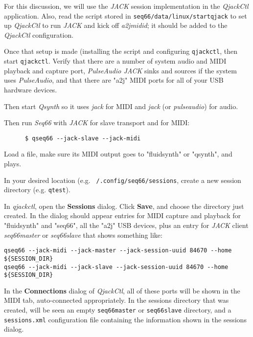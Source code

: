 
   For this discussion, we will use the \textsl{JACK} session implementation in
   the \textsl{QjackCtl} application.
   Also, read the script stored in
   \texttt{seq66/data/linux/startqjack} to set up
   \textsl{QjackCtl} to run \textsl{JACK} and kick off
   \textsl{a2jmidid}; it should be added to the \textsl{QjackCtl}
   configuration.

   Once that setup is made (installing the script and configuring
   \texttt{qjackctl}, then start \texttt{qjackctl}.
   Verify that there are a number of system audio and MIDI playback and capture
   port, \textsl{PulseAudio JACK} sinks and sources if the system uses
   \textsl{PulseAudio}, and that there are "a2j" MIDI ports for all of your USB
   hardware devices.

   Then start \textsl{Qsynth} so it uses \textsl{jack} for MIDI and
   \textsl{jack} (or \textsl{pulseaudio}) for audio.

   Then run \textsl{Seq66} with \textsl{JACK} for slave transport and for MIDI:

   \begin{verbatim}
      $ qseq66 --jack-slave --jack-midi
   \end{verbatim}

   Load a file, make sure its MIDI output goes to "fluidsynth" or "qsynth", and
   plays.

   In your desired location (e.g. \texttt{~/.config/seq66/sessions},
   create a new session directory (e.g. \texttt{qtest}).

   In \textsl{qjackctl}, open the \textbf{Sessions} dialog.
   Click \textbf{Save}, and choose the directory just created.
   In the dialog should appear entries for MIDI capture and playback for
   "fluidsynth" and "seq66", all the "a2j" USB devices,
   plus an entry for \textsl{JACK} client
   \textsl{seq66master} or \textsl{seq66slave} that shows
   something like:

   \begin{verbatim}
qseq66 --jack-midi --jack-master --jack-session-uuid 84670 --home ${SESSION_DIR}
qseq66 --jack-midi --jack-slave --jack-session-uuid 84670 --home ${SESSION_DIR}
   \end{verbatim}

   In the \textbf{Connections} dialog of \textsl{QjackCtl}, all of these ports
   will be shown in the MIDI tab, auto-connected appropriately.
   In the sessions directory that was created, will be seen an
   empty \texttt{seq66master}
   or \texttt{seq66slave} directory, and a
   \texttt{sessions.xml} configuration file containing the information shown in
   the sessions dialog.

